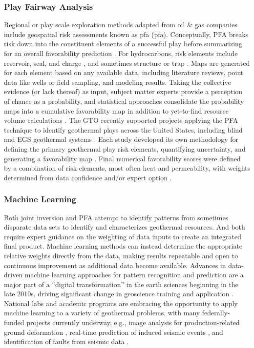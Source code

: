 \subsubsection{Play Fairway Analysis}\label{ch2:pfa}
Regional or play scale exploration methods adapted from oil \& gas companies include geospatial risk assessments known as \acrlong{pfa} (\acrshort{pfa}). Conceptually, PFA breaks risk down into the constituent elements of a successful play before summarizing for an overall favorability prediction \citep{garchar_geothermal_2016}. For hydrocarbons, risk elements include reservoir, seal, and charge \citep{fraser_regional_2010}, and sometimes structure or trap \citep{doust_exploration_2010}. Maps are generated for each element based on any available data, including literature reviews, point data like wells or field sampling, and modeling results. Taking the collective evidence (or lack thereof) as input, subject matter experts provide a perception of chance as a probability, and statistical approaches consolidate the probability maps into a cumulative favorability map in addition to yet-to-find resource volume calculations \citep{lottaroli_evaluating_2018}. The GTO recently supported projects applying the PFA technique to identify geothermal plays across the United States, including blind and EGS geothermal systems \citep{eeri_play_2014}. Each study developed its own methodology for defining the primary geothermal play risk elements, quantifying uncertainty, and generating a favorability map \citep{faulds_discovering_2019, jordan_low_2016, nash_phase_2017, wannamaker_structurally_2016}. Final numerical favorability scores were defined by a combination of risk elements, most often heat and permeability, with weights determined from data confidence and/or expert option \citep{garchar_geothermal_2016}.

\subsubsection{Machine Learning}\label{ch2:machine_learning}
Both joint inversion and PFA attempt to identify patterns from sometimes disparate data sets to identify and characterizes geothermal resources. And both require expert guidance on the weighting of data inputs to create an integrated final product. Machine learning methods can instead determine the appropriate relative weights directly from the data, making results repeatable and open to continuous improvement as additional data become available. Advances in data-driven machine learning approaches for pattern recognition and prediction are a major part of a ``digital transformation” in the earth sciences beginning in the late 2010s, driving significant change in geoscience training and application \citep{gunderson_recent_2020}. National labs and academic programs are embracing the opportunity to apply machine learning to a variety of geothermal problems, with many federally-funded projects currently underway, e.g., image analysis for production-related ground deformation \citep{cavur_dinsar_2021}, real-time prediction of induced seismic events \citep{small_theory_2019}, and identification of faults from seismic data \citep{gao_delineating_2021}.

